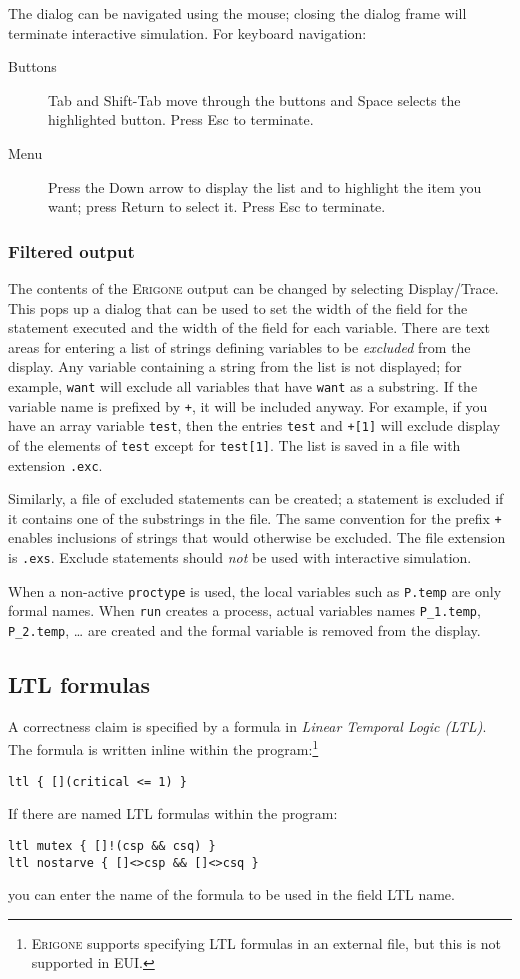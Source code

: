 \documentclass[11pt]{article}
\newcommand{\eri}{\textsc{Erigone}}
\newcommand{\eui}{\textsc{EUI}}
\newcommand{\p}[1]{\texttt{#1}}
\newcommand{\bu}[1]{\textsf{#1}}
\begin{document}
The dialog can be navigated using the mouse; closing the dialog frame
will terminate interactive simulation. For keyboard navigation:
\begin{description}
\item[Buttons] \bu{Tab} and \bu{Shift-Tab} move through the buttons
and \bu{Space} selects the highlighted button. Press \bu{Esc} to terminate.
\item[Menu] Press the \bu{Down arrow} to display the list and to highlight the
item you want; press \bu{Return} to select it. Press \bu{Esc} to terminate.
\end{description}

\subsubsection{Filtered output}\label{s.filter}
The contents of the \eri{} output can be changed by selecting 
\bu{Display/Trace}. This pops up a dialog that can be used to set the
width of the field for the statement executed and the width of the field
for each variable. There are text areas for entering a list of strings defining 
variables to be \emph{excluded} from the display. Any variable containing 
a string from the list is not displayed; for example, \p{want} will 
exclude all variables that have \p{want} as a substring. If the variable name is 
prefixed by \p{+}, it will be included anyway. For example, if you have an 
array variable \p{test}, then the entries \p{test} and \p{+[1]} will 
exclude display of the elements of \p{test} except for \p{test[1]}. The 
list is saved in a file with extension \p{.exc}.

Similarly, a file of excluded statements can be created; a statement is
excluded if it contains one of the substrings in the file. The same
convention for the prefix \p{+} enables inclusions of strings that would
otherwise be excluded. The file extension is \p{.exs}. \bu{Exclude
statements} should \emph{not} be used with interactive simulation.

When a non-active \p{proctype} is used, the local variables such as
\p{P.temp} are only formal names. When \p{run} creates a process, actual
variables names \p{P\_1.temp}, \p{P\_2.temp}, \ldots{} are created and
the formal variable is removed from the display.

\subsection{LTL formulas}
A correctness claim is specified by a formula
in \emph{Linear Temporal Logic (LTL)}. The formula is written inline
within the program:\footnote{\eri{} supports specifying LTL formulas in
an external file, but this is not supported in \eui{}.}
\begin{verbatim}
ltl { [](critical <= 1) }
\end{verbatim}
If there are named LTL formulas within the program:
\begin{verbatim}
ltl mutex { []!(csp && csq) }
ltl nostarve { []<>csp && []<>csq }
\end{verbatim}
you can enter the name of the formula to be used in the field \bu{LTL
name}.
\end{document}
